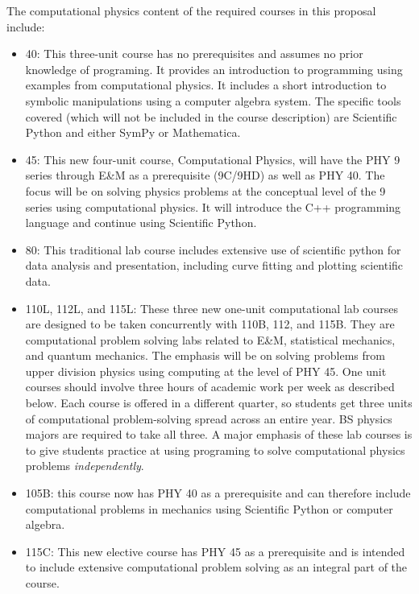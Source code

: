 \documentclass[12pt]{article}
\begin{document}
The computational physics content of the required courses in this
proposal include:
\begin{itemize}
\item 40: This three-unit course has no prerequisites and assumes no
  prior knowledge of programing.  It provides an introduction to
  programming using examples from computational physics.  It includes
  a short introduction to symbolic manipulations using a computer
  algebra system.  The specific tools covered (which will not be
  included in the course description) are Scientific Python and either
  SymPy or Mathematica.

\item 45: This new four-unit course, Computational Physics, will have
  the PHY 9 series through E\&M as a prerequisite (9C/9HD) as well as
  PHY 40.  The focus will be on solving physics problems at the
  conceptual level of the 9 series using computational physics.  It
  will introduce the C++ programming language and continue using
  Scientific Python.
  
\item 80: This traditional lab course includes extensive use of
  scientific python for data analysis and presentation, including
  curve fitting and plotting scientific data.
  
\item 110L, 112L, and 115L: These three new one-unit computational lab
  courses are designed to be taken concurrently with 110B, 112, and
  115B. They are computational problem solving labs related to E\&M,
  statistical mechanics, and quantum mechanics.  The emphasis will be
  on solving problems from upper division physics using computing at
  the level of PHY 45.  One unit courses should involve three hours of
  academic work per week as described below.  Each course is offered
  in a different quarter, so students get three units of computational
  problem-solving spread across an entire year.  BS physics majors are
  required to take all three.  A major emphasis of these lab courses
  is to give students practice at using programing to solve
  computational physics problems {\em independently}.
  
\item 105B: this course now has PHY 40 as a prerequisite and can
  therefore include computational problems in mechanics using
  Scientific Python or computer algebra.

\item 115C: This new elective course has PHY 45 as a prerequisite and
  is intended to include extensive computational problem solving as an
  integral part of the course.
  
\end{itemize}
\end{document}
